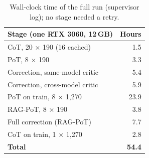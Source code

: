 \begin{table}[t]
\centering
\footnotesize
\caption{Wall-clock time of the full run (supervisor log); no stage needed a retry.}
\label{tab:compute}
\setlength{\tabcolsep}{3.5pt}
\begin{tabular}{lr}
\toprule
Stage (one RTX 3060, 12\,GB) & Hours \\
\midrule
CoT, 20 $\times$ 190 (16 cached) & 1.5 \\
PoT, 8 $\times$ 190 & 3.3 \\
Correction, same-model critic & 5.4 \\
Correction, cross-model critic & 5.9 \\
PoT on train, 8 $\times$ 1{,}270 & 23.9 \\
RAG-PoT, 8 $\times$ 190 & 3.8 \\
Full correction (RAG-PoT) & 7.7 \\
CoT on train, 1 $\times$ 1{,}270 & 2.8 \\
\textbf{Total} & \textbf{54.4} \\
\bottomrule
\end{tabular}
\end{table}
